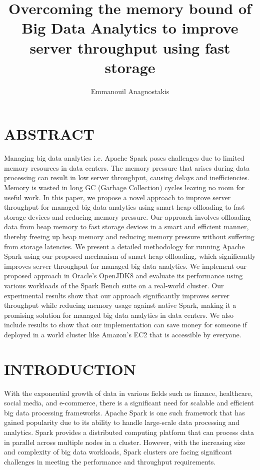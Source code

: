 \documentclass[twocolumn,10pt]{asme2e}
\title{Overcoming the memory bound of Big Data Analytics to improve server throughput using fast storage}
\author{Emmanouil Anagnostakis
    \affiliation{
	    Graduate Research Assistant\\
	    Computer Architecture and VLSI Systems Laboratory, ICS-FORTH\\
	    Heraklion, Greece\\
      manosanag@ics.forth.gr
    }	
}
\begin{document}
\maketitle    

\section*{ABSTRACT}

Managing big data analytics i.e. Apache Spark poses challenges due to limited memory resources in data centers. The memory pressure that arises during data processing can result in low server throughput, causing delays and inefficiencies. Memory is wasted in long GC (Garbage Collection) cycles leaving no room for useful work. In this paper, we propose a novel approach to improve server throughput for managed big data analytics using smart heap offloading to fast storage devices and reducing memory pressure. Our approach involves offloading data from heap memory to fast storage devices in a smart and efficient manner, thereby freeing up heap memory and reducing memory pressure without suffering from storage latencies. We present a detailed methodology for running Apache Spark using our proposed mechanism of smart heap offloading, which significantly improves server throughput for managed big data analytics. We implement our proposed approach in Oracle's OpenJDK8 and evaluate its performance using various workloads of the Spark Bench suite on a real-world cluster. Our experimental results show that our approach significantly improves server throughput while reducing memory usage against native Spark, making it a promising solution for managed big data analytics in data centers. We also include results to show that our implementation can save money for someone if deployed in a world cluster like Amazon's EC2 that is accessible by everyone. 

\section*{INTRODUCTION}

With the exponential growth of data in various fields such as finance, healthcare, social media, and e-commerce, there is a significant need for scalable and efficient big data processing frameworks. Apache Spark \cite{Spark} is one such framework that has gained popularity due to its ability to handle large-scale data processing and analytics. Spark provides a distributed computing platform that can process data in parallel across multiple nodes in a cluster. However, with the increasing size and complexity of big data workloads, Spark clusters are facing significant challenges in meeting the performance and throughput requirements.
\end{document}
